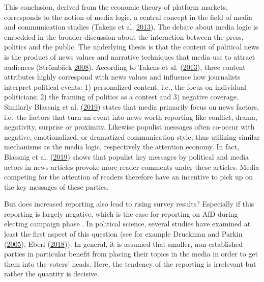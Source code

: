 \documentclass[
]{article}
\begin{document}
This conclusion, derived from the economic theory of platform markets,
corresponds to the notion of media logic, a central concept in the field
of media and communication studies (Takens et al.
\protect\hyperlink{ref-takens_media_2013}{2013}). The debate about media
logic is embedded in the broader discussion about the interaction
between the press, politics and the public. The underlying thesis is
that the content of political news is the product of news values and
narrative techniques that media use to attract audiences (Strömbäck
\protect\hyperlink{ref-stromback_four_2008}{2008}). According to Takens
et al. (\protect\hyperlink{ref-takens_media_2013}{2013}), three content
attributes highly correspond with news values and influence how
journalists interpret political events: 1) personalized content, i.e.,
the focus on individual politicians; 2) the framing of politics as a
contest and 3) negative coverage. Similarly Blassnig et al.
(\protect\hyperlink{ref-blassnig_hitting_2019}{2019}) states that media
primarily focus on news factors, i.e.~the factors that turn an event
into news worth reporting like conflict, drama, negativity, surprise or
proximity. Likewise populist messages often co-occur with negative,
emotionalized, or dramatized communication style, thus utilizing similar
mechanisms as the media logic, respectively the attention economy. In
fact, Blassnig et al.
(\protect\hyperlink{ref-blassnig_hitting_2019}{2019}) shows that
populist key messages by political and media actors in news articles
provoke more reader comments under these articles. Media competing for
the attention of readers therefore have an incentive to pick up on the
key messages of these parties.

But does increased reporting also lead to rising survey results?
Especially if this reporting is largely negative, which is the case for
reporting on AfD during electing campaign phase . In political science,
several studies have examined at least the first aspect of this question
(see for example Druckman and Parkin
(\protect\hyperlink{ref-druckman_impact_2005}{2005}), Eberl
(\protect\hyperlink{ref-eberl_lying_2018}{2018})). In general, it is
assumed that smaller, non-established parties in particular benefit from
placing their topics in the media in order to get them into the voters'
heads. Here, the tendency of the reporting is irrelevant but rather the
quantity is decisive.
\end{document}
